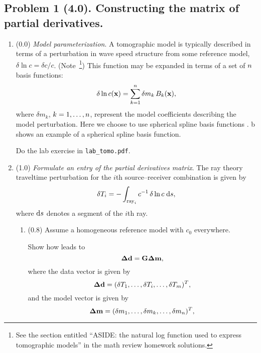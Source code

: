 \documentclass[11pt,titlepage,fleqn]{article}
\begin{document}

\subsection*{Problem 1 (4.0). Constructing the matrix of partial derivatives.}

\begin{enumerate}
\item (0.0) {\em Model parameterization}. A tomographic model is typically described in terms of a perturbation in wave speed structure from some reference model, \ie $\delta\ln c = \delta c/c$.
(Note~\footnote{See the section entitled ``ASIDE: the natural log function used to express tomographic models'' in the math review homework solutions.})
This function may be expanded in terms of a set of $n$ basis functions:
%
\begin{equation}
\delta\ln c(\mbox{${\bf x}$})=\sum_{k=1}^n \delta m_k\,B_k(\mbox{${\bf x}$}),
\label{dlnv}
\end{equation}
%
where $\delta m_k$, $k=1,\ldots,n$, represent the model coefficients describing the model perturbation.  Here we choose to use spherical spline basis functions \citep{WangDahlen1995spline,Wang1998}.
b shows an example of a spherical spline basis function.

Do the lab exercise in \verb+lab_tomo.pdf+.


\item (1.0) {\em Formulate an entry of the partial derivatives matrix}.
%
The ray theory traveltime perturbation for the $i$th source--receiver combination is given by
%
\begin{equation}
\delta T_i = -\int_{\mathrm{ray}_i} c^{-1}\,\delta\ln c\;\mathrm{d} s,
\label{ray_tomography}
\end{equation}
%
where $\mathrm{d} s$ denotes a segment of the $i$th ray.

\begin{enumerate}
\item (0.8) Assume a homogeneous reference model with $c_0$ everywhere.

Show how  leads to 
%
\begin{equation}
\mbox{\boldmath $\bf \Delta$}\mbox{${\bf d}$} = \mbox{${\bf G}$}\mbox{\boldmath $\bf \Delta$}\mbox{${\bf m}$},
\end{equation}
%
where the data vector is given by
%
\begin{equation}
\mbox{\boldmath $\bf \Delta$}\mbox{${\bf d}$} = (\delta T_1,\ldots,\delta T_i,\ldots,\delta T_m)^T,
\label{d}
\end{equation}
%
and the model vector is given by
%
\begin{equation}
\mbox{\boldmath $\bf \Delta$}\mbox{${\bf m}$} = (\delta m_1,\ldots,\delta m_k,\ldots,\delta m_n)^T,
\label{m}
\end{equation}


\end{enumerate}
\end{enumerate}
\end{document}

